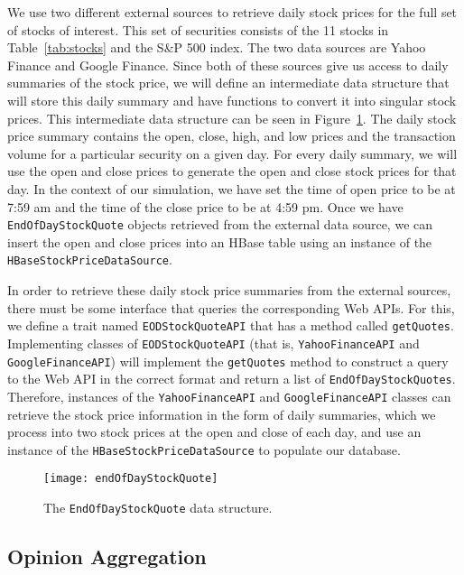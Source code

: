 We use two different external sources to retrieve daily stock prices for the full set of stocks of interest.
This set of securities consists of the 11 stocks in Table~\ref{tab:stocks} and the S\&P 500 index.
The two data sources are Yahoo Finance and Google Finance.
Since both of these sources give us access to daily summaries of the stock price, we will define an intermediate data structure that will store this daily summary and have functions to convert it into singular stock prices.
This intermediate data structure can be seen in Figure~\ref{endOfDayStockQuote}.
The daily stock price summary contains the open, close, high, and low prices and the transaction volume for a particular security on a given day.
For every daily summary, we will use the open and close prices to generate the open and close stock prices for that day.
In the context of our simulation, we have set the time of open price to be at 7:59 am and the time of the close price to be at 4:59 pm.
Once we have \texttt{EndOfDayStockQuote} objects retrieved from the external data source, we can insert the open and close prices into an HBase table using an instance of the \texttt{HBaseStockPriceDataSource}.

In order to retrieve these daily stock price summaries from the external sources, there must be some interface that queries the corresponding Web APIs.
For this, we define a trait named \texttt{EODStockQuoteAPI} that has a method called \texttt{getQuotes}.
Implementing classes of \texttt{EODStockQuoteAPI} (that is, \texttt{YahooFinanceAPI} and \texttt{GoogleFinanceAPI}) will implement the \texttt{getQuotes} method to construct a query to the Web API in the correct format and return a list of \texttt{EndOfDayStockQuotes}.
Therefore, instances of the \texttt{YahooFinanceAPI} and \texttt{GoogleFinanceAPI} classes can retrieve the stock price information in the form of daily summaries, which we process into two stock prices at the open and close of each day, and use an instance of the \texttt{HBaseStockPriceDataSource} to populate our database.

\begin{figure}[h]
  \label{endOfDayStockQuote}
  \begin{center}
    \texttt{[image: endOfDayStockQuote]}
  \end{center}
  \caption{The \texttt{EndOfDayStockQuote} data structure.}
\end{figure}

\subsection{Opinion Aggregation}

